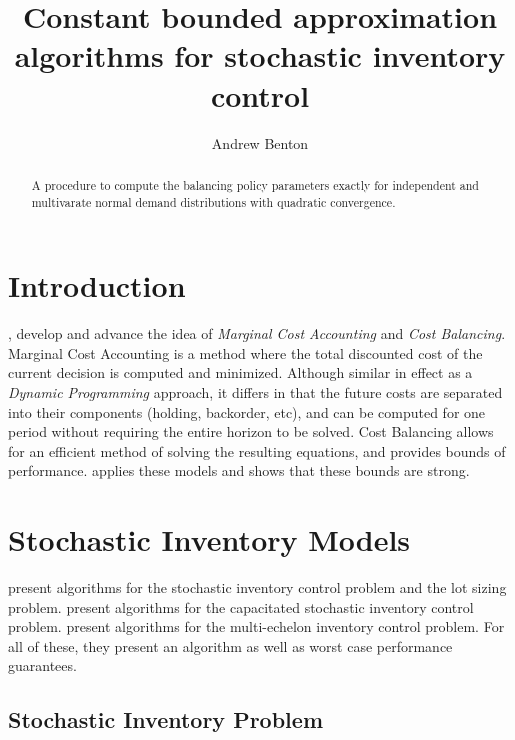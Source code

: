 \documentclass[12pt]{article}
\author{Andrew Benton}
\title{Constant bounded approximation algorithms for stochastic inventory control}
\begin{document}
\maketitle

\begin{abstract}
A procedure to compute the balancing policy parameters exactly for independent and multivarate normal demand distributions with quadratic convergence. 
\end{abstract}

\section{Introduction}

\cite{levi:2007}, \cite{levi:2008} develop and advance the idea of \textit{Marginal Cost Accounting} and \textit{Cost Balancing}. Marginal Cost Accounting is a method where the total discounted cost of the current decision is computed and minimized. Although similar in effect as a \textit{Dynamic Programming} approach, it differs in that the future costs are separated into their components (holding, backorder, etc), and can be computed for one period without requiring the entire horizon to be solved. Cost Balancing allows for an efficient method of solving the resulting equations, and provides bounds of performance. \cite{hurley:2007} applies these models and shows that these bounds are strong.

\section{Stochastic Inventory Models}

\cite{levi:2007} present algorithms for the stochastic inventory control problem and the lot sizing problem. \cite{levi:2008} present algorithms for the capacitated stochastic inventory control problem. \cite{levi:2016} present algorithms for the multi-echelon inventory control problem. For all of these, they present an algorithm as well as worst case performance guarantees. 

\subsection{Stochastic Inventory Problem}
\end{document}
